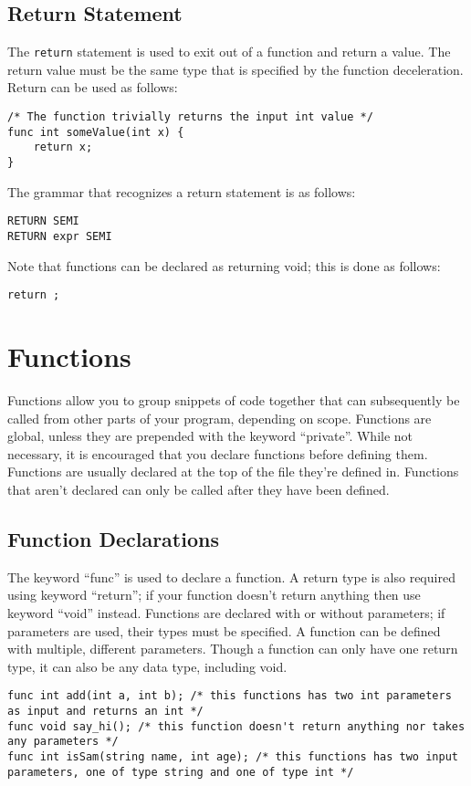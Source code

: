 \documentclass{article}
\begin{document}
\subsection{Return Statement}
The \texttt{return} statement is used to exit out of a function and return a value.  The return value must be the same type that is specified by the function deceleration.  Return can be used as follows:

\begin{lstlisting}
/* The function trivially returns the input int value */
func int someValue(int x) {
	return x;
}
\end{lstlisting}

The grammar that recognizes a return statement is as follows:
\begin{Verbatim}[frame=single]
RETURN SEMI
RETURN expr SEMI
\end{Verbatim}
Note that functions can be declared as returning void; this is done as follows: 
\begin{lstlisting}
return ;
\end{lstlisting}

\section{Functions}
Functions allow you to group snippets of code together that can subsequently be called from other parts of your program, depending on scope. Functions are global, unless they are prepended with the keyword ``private''. While not necessary, it is encouraged that you declare functions before defining them. Functions are usually declared at the top of the file they're defined in. Functions that aren't declared can only be called after they have been defined. 

\subsection{Function Declarations}

The keyword ``func'' is used to declare a function. A return type is also required using keyword ``return''; if your function doesn't return anything then use keyword ``void'' instead.  Functions are declared with or without parameters; if parameters are used, their types must be specified. A function can be defined with multiple, different parameters. Though a function can only have one return type, it can also be any data type, including void.

\begin{lstlisting}
func int add(int a, int b); /* this functions has two int parameters as input and returns an int */
func void say_hi(); /* this function doesn't return anything nor takes any parameters */
func int isSam(string name, int age); /* this functions has two input parameters, one of type string and one of type int */

\end{lstlisting}
\end{document}
